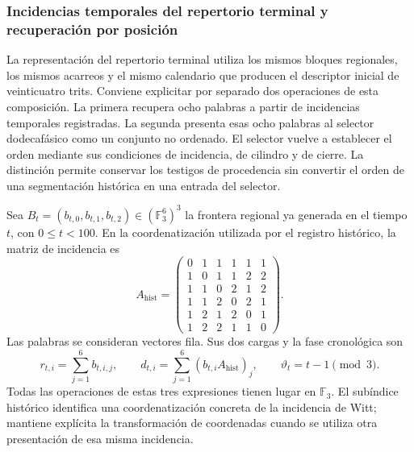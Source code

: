 \subsubsection{Incidencias temporales del repertorio terminal y recuperación por posición}
\label{act21:sec:repertorio-incidencias-completas}

La representación del repertorio terminal utiliza los mismos bloques regionales,
los mismos acarreos y el mismo calendario que producen el descriptor inicial
de veinticuatro trits. Conviene explicitar por separado dos operaciones de
esta composición. La primera recupera ocho palabras a partir de incidencias
temporales registradas. La segunda presenta esas ocho palabras al selector
dodecafásico como un conjunto no ordenado. El selector vuelve a establecer
el orden mediante sus condiciones de incidencia, de cilindro y de cierre.
La distinción permite conservar los testigos de procedencia sin convertir
el orden de una segmentación histórica en una entrada del selector.

Sea $B_t=(b_{t,0},b_{t,1},b_{t,2})\in(\mathbb F_3^6)^3$ la frontera
regional ya generada en el tiempo $t$, con $0\leq t<100$. En la coordenatización
utilizada por el registro histórico, la matriz de incidencia es
\[
 A_{\mathrm{hist}}=
 \begin{pmatrix}
 0&1&1&1&1&1\\
 1&0&1&1&2&2\\
 1&1&0&2&1&2\\
 1&1&2&0&2&1\\
 1&2&1&2&0&1\\
 1&2&2&1&1&0
 \end{pmatrix}.
\]
Las palabras se consideran vectores fila. Sus dos cargas y la fase
cronológica son
\[
 r_{t,i}=\sum_{j=1}^{6}b_{t,i,j},\qquad
 d_{t,i}=\sum_{j=1}^{6}(b_{t,i}A_{\mathrm{hist}})_j,
 \qquad \vartheta_t=t-1\pmod 3.
\]
Todas las operaciones de estas tres expresiones tienen lugar en
$\mathbb F_3$. El subíndice histórico identifica una coordenatización concreta de
la incidencia de Witt; mantiene explícita la transformación de coordenadas
cuando se utiliza otra presentación de esa misma incidencia.

